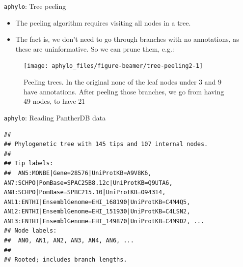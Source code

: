 \documentclass[9pt,ignorenonframetext,]{beamer}
\newenvironment{Shaded}{\begin{snugshade}}{\end{snugshade}}
\newcommand{\KeywordTok}[1]{\textcolor[rgb]{0.94,0.87,0.69}{#1}}
\newcommand{\DataTypeTok}[1]{\textcolor[rgb]{0.87,0.87,0.75}{#1}}
\newcommand{\StringTok}[1]{\textcolor[rgb]{0.80,0.58,0.58}{#1}}
\newcommand{\CommentTok}[1]{\textcolor[rgb]{0.50,0.62,0.50}{#1}}
\newcommand{\OperatorTok}[1]{\textcolor[rgb]{0.94,0.94,0.82}{#1}}
\newcommand{\NormalTok}[1]{\textcolor[rgb]{0.80,0.80,0.80}{#1}}
\begin{document}
\begin{frame}[t]{\texttt{aphylo}: Tree peeling}

\begin{itemize}
\item
  The peeling algorithm requires visiting all nodes in a tree.\pause
\item
  The fact is, we don't need to go through branches with no annotations,
  as these are uninformative. \pause So we can prune them, e.g.:\pause
\end{itemize}

\footnotesize

\normalsize

\footnotesize

\begin{figure}

{\centering \texttt{[image: aphylo\_files/figure-beamer/tree-peeling2-1]} 

}

\caption{Peeling trees. In the original none of the leaf nodes under 3 and 9 have annotations. After peeling those branches, we go from having 49  nodes, to have 21}\label{fig:tree-peeling2}
\end{figure}

\normalsize

\end{frame}

\begin{frame}[fragile]{\texttt{aphylo}: Reading PantherDB data}

\footnotesize

\begin{Shaded}
\end{Shaded}

\begin{verbatim}
## 
## Phylogenetic tree with 145 tips and 107 internal nodes.
## 
## Tip labels:
##  AN5:MONBE|Gene=28576|UniProtKB=A9V8K6, AN7:SCHPO|PomBase=SPAC25B8.12c|UniProtKB=Q9UTA6, AN8:SCHPO|PomBase=SPBC215.10|UniProtKB=O94314, AN11:ENTHI|EnsemblGenome=EHI_168190|UniProtKB=C4M4Q5, AN12:ENTHI|EnsemblGenome=EHI_151930|UniProtKB=C4LSN2, AN13:ENTHI|EnsemblGenome=EHI_149870|UniProtKB=C4M9D2, ...
## Node labels:
##  AN0, AN1, AN2, AN3, AN4, AN6, ...
## 
## Rooted; includes branch lengths.
\end{verbatim}

\normalsize

\end{frame}
\end{document}
